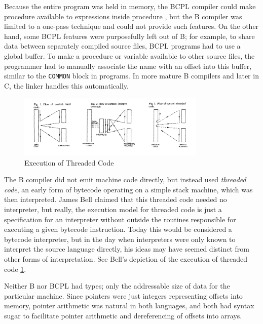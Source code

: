 Because the entire program was held in memory, the BCPL compiler could make
procedure  available to expressions inside procedure ,
but the B compiler was limited to a one-pass technique and could not provide such features.
On the other hand, some BCPL features were purposefully left out of B; for example,
to share data between separately compiled source files, BCPL programs had to use
a global buffer. To make a procedure or variable available to other source files,
the programmer had to manually associate the name with an offset into this buffer,
similar to the \texttt{COMMON} block in \ftn{} programs.
In more mature B compilers and later in C, the linker handles this automatically.

\begin{figure}[h]
	\centering
	\includegraphics[width=0.8\textwidth]{resource/software/unix/bell-threaded-code-figures.png}
	\caption{Execution of Threaded Code\cite{bell_threaded_code_1973}}
	\label{fig:bell-threaded-code}
\end{figure}

The B compiler did not emit machine code directly, but instead used
\textit{threaded code}\cite{bell_threaded_code_1973}, an early form of \gls{bytecode}
operating on a simple stack machine, which was then interpreted.
James Bell claimed that this threaded code needed no interpreter,
but really, the execution model for threaded code is just a specification
for an interpreter without outside the routines responsible for executing a given
bytecode instruction.
Today this would be considered a bytecode interpreter, but in the day when interpreters
were only known to interpret the source language directly, his ideas may have seemed
distinct from other forms of interpretation.
See Bell's depiction of the execution of threaded code \ref{fig:bell-threaded-code}.

Neither B nor BCPL had types; only the addressable size of data for the particular machine.
Since pointers were just integers representing offsets into memory, pointer arithmetic
was natural in both languages, and both had syntax sugar to facilitate pointer arithmetic
and dereferencing of offsets into arrays.

